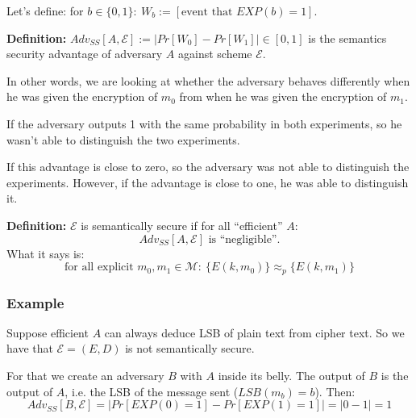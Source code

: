 \documentclass[12pt]{book}
\newcommand{\Def}{\textcolor{dkgreen}{\textbf{Definition:}} }
\begin{document}
Let's define: for $b\in\{0,1\}:\ W_{b}:=[\text{event that }EXP(b)=1]$.

\Def $Adv_{SS}[A,\mathcal{E}]:=\Big|Pr[W_{0}]-Pr[W_{1}]\Big|\in[0,1]$ is the semantics security advantage of adversary $A$ against scheme $\mathcal{E}$.

In other words, we are looking at whether the adversary behaves differently when he was given the encryption of $m_{0}$ from when he was given the encryption of $m_{1}$.

If the adversary outputs 1 with the same probability in both experiments, so he wasn't able to distinguish the two experiments.

If this advantage is close to zero, so the adversary was not able to distinguish the experiments. However, if the advantage is close to one, he was able to distinguish it.

\Def $\mathcal{E}$ is semantically secure if for all ``efficient'' $A$:
$$Adv_{SS}[A,\mathcal{E}]\text{ is ``negligible''.}$$What it says is:
$$\text{for all explicit }m_{0},m_{1}\in\mathcal{M}:\ \{E(k,m_{0})\}\approx_{p}\{E(k,m_{1})\}$$

\subsubsection{Example}
Suppose efficient $A$ can always deduce LSB of plain text from cipher text. So we have that $\mathcal{E}=(E,D)$ is not semantically secure.

For that we create an adversary $B$ with $A$ inside its belly. The output of $B$ is the output of $A$, i.e. the LSB of the message sent ($LSB(m_{b})=b$). Then:
$$Adv_{SS}[B,\mathcal{E}]=\Big|Pr[EXP(0)=1]-Pr[EXP(1)=1]\Big|=|0-1|=1$$
\end{document}
